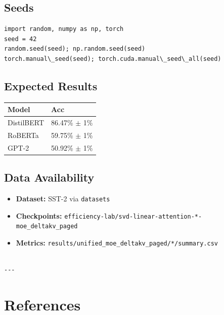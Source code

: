 \subsection{Seeds}

\begin{lstlisting}
import random, numpy as np, torch
seed = 42
random.seed(seed); np.random.seed(seed)
torch.manual\_seed(seed); torch.cuda.manual\_seed\_all(seed)
\end{lstlisting}

\subsection{Expected Results}

\begin{table}[H]
\centering
\small
\begin{tabular}{ll}
\toprule
\textbf{Model} & \textbf{Acc} \\
\midrule
DistilBERT & 86.47\% $\pm$ 1\% \\
RoBERTa & 59.75\% $\pm$ 1\% \\
GPT-2 & 50.92\% $\pm$ 1\% \\
\bottomrule
\end{tabular}
\end{table}

\subsection{Data Availability}

\begin{itemize}
\item \textbf{Dataset:} SST-2 via \texttt{datasets}
\item \textbf{Checkpoints:} \texttt{efficiency-lab/svd-linear-attention-*-moe\_deltakv\_paged}
\item \textbf{Metrics:} \texttt{results/unified\_moe\_deltakv\_paged/*/summary.csv}
\end{itemize}
\begin{lstlisting}

---
\end{lstlisting}

\section{References}

